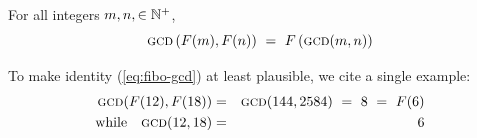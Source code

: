 \begin{prop}
For all integers $m, n, \in \mathbb{N}^+$,
\begin{equation}
\label{eq:fibo-gcd}
\mbox{\sc gcd} \left(F(m), F(n) \right) \ = \ F \left(\mbox{\sc gcd}(m, n) \right)
\end{equation}
\end{prop}

\smallskip

\noindent
To make identity (\ref{eq:fibo-gcd}) at least plausible, we cite a single example:
\begin{eqnarray*}
\mbox{\sc gcd}(F(12), F(18)) & = & \mbox{\sc gcd}(144,2584) \ = \ 8 \ = \ F(6) \\
\mbox{while } \ \ \mbox{\sc gcd}(12,18) & = & 6
\end{eqnarray*}

\medskip

